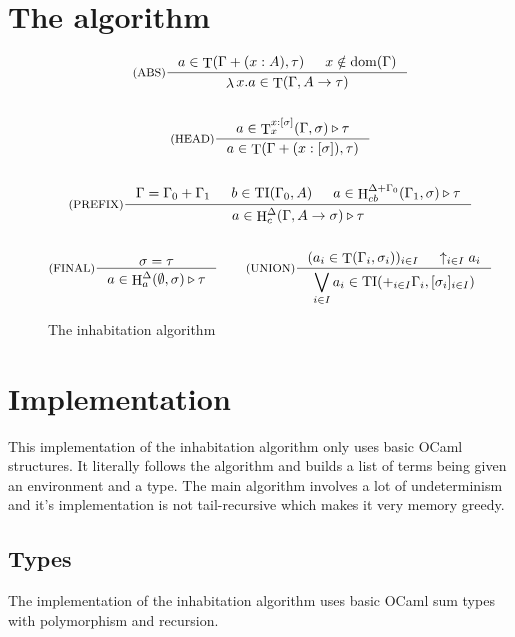\documentclass{article}
\DeclareMathOperator{\iT}{T}
\DeclareMathOperator{\iH}{H}
\DeclareMathOperator{\iTI}{TI}
\DeclareMathOperator{\iDom}{dom}
\DeclareMathOperator{\iLambda}{\lambda}
\begin{document}
\section{The algorithm}
\begin{figure}[h]
    \begin{mdframed}
        \begin{gather*}
            \inference[(ABS)]{a \in \iT(\Gamma + (x : A), \tau) & x \notin \iDom(\Gamma)}{\iLambda x.a \in \iT(\Gamma, A \rightarrow \tau)}
            \\ \\
            \inference[(HEAD)]{a \in \iT^{x:[\sigma]}_x(\Gamma, \sigma) \triangleright \tau}{a \in\iT(\Gamma + (x:[\sigma]), \tau) }
            \\ \\
            \inference[(PREFIX)]{\Gamma = \Gamma_0 + \Gamma_1 & b \in \iTI(\Gamma_0, A) & a \in \iH^{\Delta + \Gamma_0}_{cb}(\Gamma_1, \sigma) \triangleright \tau}{a \in \iH^{\Delta}_c(\Gamma, A \rightarrow \sigma) \triangleright \tau}
            \\ \\
            \inference[(FINAL)]{\sigma = \tau}{a \in \iH^{\Delta}_a(\emptyset, \sigma) \triangleright \tau}
            \qquad
            \inference[(UNION)]{(a_i \in \iT(\Gamma_i, \sigma_i))_{i \in I} & \uparrow_{i \in I}a_i}{\displaystyle \bigvee_{i \in I} a_i \in \iTI(+_{i \in I}\Gamma_i, [\sigma_i]_{i \in I}) }
        \end{gather*}
    \end{mdframed}
  \caption{The inhabitation algorithm}
  \label{INH}
\end{figure}

\section{Implementation}
This implementation of the inhabitation algorithm only uses basic OCaml structures. It literally follows the algorithm and builds a list of terms being given an environment and a type. The main algorithm involves a lot of undeterminism and it's implementation is not tail-recursive which makes it very memory greedy.

\subsection{Types}
The implementation of the inhabitation algorithm uses basic OCaml sum types with polymorphism and recursion. 
\end{document}
